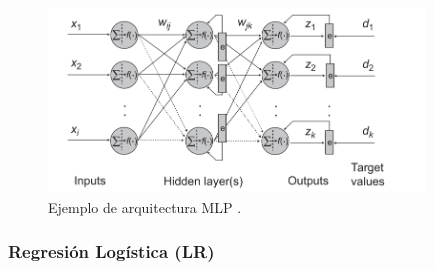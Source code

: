 \begin{figure}[H]
	\centering
	\includegraphics[width=10cm]{Figures/Background/MLP.png}
	\caption{Ejemplo de arquitectura MLP \cite{PEDRO2017111}.}
	\label{MLP_BACKGROUND}
\end{figure}










\subsubsection*{Regresión Logística (LR)}



